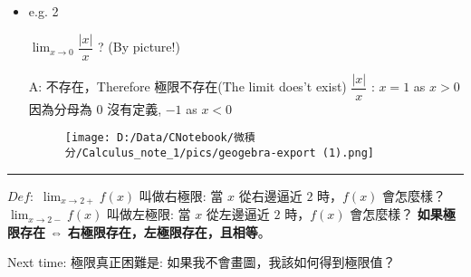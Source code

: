 \documentclass[]{article}
\begin{document}
\begin{itemize}
\item
  e.g. 2

  \(\lim _{x\rightarrow 0}\dfrac {\left| x\right| }{x}\) ? (By picture!)

  A: 不存在，Therefore 極限不存在(The limit does't exist)
  \(\dfrac {\left| x\right| }{x}\) : \(x=1\) as \(x>0\) 因為分母為 \(0\)
  沒有定義, \(-1\) as \(x<0\)

  \begin{figure}
  \centering
  \texttt{[image: D:/Data/CNotebook/微積分/Calculus\_note\_1/pics/geogebra-export (1).png]}
  \caption{}
  \end{figure}
\end{itemize}

\begin{center}\rule{0.5\linewidth}{\linethickness}\end{center}

\(Def:\) \(\lim _{x\rightarrow 2+}f\left( x\right) \) 叫做右極限: 當
\(x\) 從右邊逼近 \(2\) 時，\(f(x)\) 會怎麼樣？
\(\lim _{x\rightarrow 2-}f\left( x\right) \) 叫做左極限: 當 \(x\)
從左邊逼近 \(2\) 時，\(f(x)\) 會怎麼樣？ \textbf{如果極限存在 ⇔
右極限存在，左極限存在，且相等}。

Next time: 極限真正困難是: 如果我不會畫圖，我該如何得到極限值？
\end{document}
